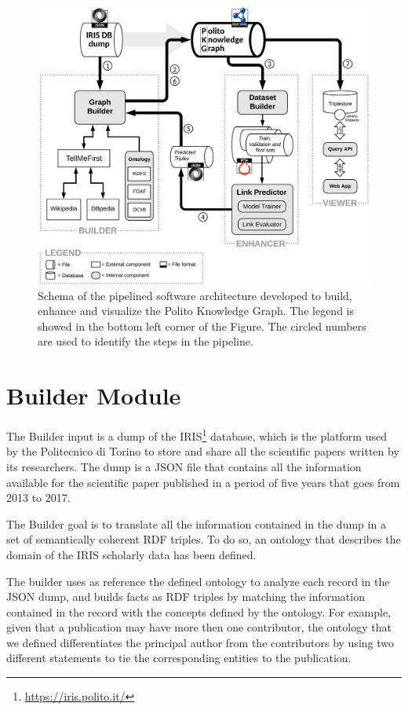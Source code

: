 \documentclass[%
    corpo=13.5pt,
    twoside,
    oldstyle,
    tipotesi=magistrale,
    greek,
    evenboxes
]{toptesi}
\begin{document}
\begin{figure}[h]
    \centering
    \includegraphics[scale=0.8]{img/pipeline.png}
    \caption{Schema of the pipelined software architecture developed to build,
    enhance and visualize the Polito Knowledge Graph.
    The legend is showed in the bottom left corner of the Figure.
    The circled numbers are used to identify the steps in the pipeline.
    }
    \label{fig:pipeline}
\end{figure}

\newpage

\section{Builder Module}

The Builder input is a dump of the
IRIS\footnote{\url{https://iris.polito.it/}} database, which is the platform
used by the Politecnico di Torino to store and share all the
scientific papers written by its researchers. The dump is a
JSON file that contains all the information available for the scientific
paper published in a period of five years that goes from 2013 to 2017.

The Builder goal is to translate all the information contained in the
dump in a set of semantically coherent RDF triples. To do so, an ontology that
describes the domain of the IRIS scholarly data has been defined.

The builder uses as reference the defined ontology to analyze each record in
the JSON dump, and builds facts as RDF triples by matching the information
contained in the record with the concepts defined by the ontology.
For example, given that a publication may have more then one contributor, the
ontology that we defined differentiates the principal author from the
contributors by using two different statements to tie the corresponding entities
to the publication.
\end{document}
